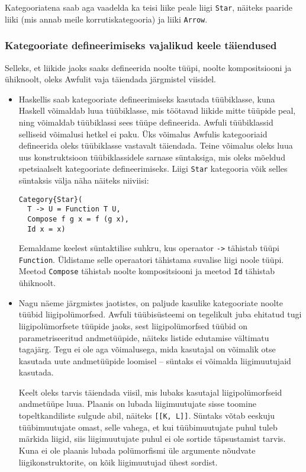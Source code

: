\documentclass[12pt]{article}
\begin{document}
      Kategooriatena saab aga vaadelda ka teisi liike peale liigi \verb!Star!, näiteks paaride liiki (mis annab meile korrutiskategooria) ja liiki \verb!Arrow!.
      \subsubsection{Kategooriate defineerimiseks vajalikud keele täiendused}
        Selleks, et liikide jaoks saaks defineerida noolte tüüpi, noolte kompositsiooni ja ühiknoolt, oleks Awfulit vaja täiendada järgmistel viisidel.

        \begin{itemize}
          \item
            Haskellis saab kategooriate defineerimiseks kasutada tüübiklasse, kuna Haskell võimaldab luua tüübiklasse, mis töötavad liikide mitte tüüpide peal, ning võimaldab tüübiklassi sees tüüpe defineerida. Awfuli tüübiklassid selliseid võimalusi hetkel ei paku. Üks võimalus Awfulis kategooriaid defineerida oleks tüübiklasse vastavalt täiendada. Teine võimalus oleks luua uus konstruktsioon tüübiklassidele sarnase süntaksiga, mis oleks mõeldud spetsiaalselt kategooriate defineerimiseks. Liigi \verb!Star! kategooria võik selles süntaksis välja näha näiteks niiviisi:

            \begin{verbatim}Category{Star}(
  T -> U = Function T U,
  Compose f g x = f (g x),
  Id x = x)\end{verbatim}

            Eemaldame keelest süntaktilise suhkru, kus operaator \verb!->! tähistab tüüpi \verb!Function!. Üldistame selle operaatori tähistama suvalise liigi noole tüüpi. Meetod \verb!Compose! tähistab noolte kompositsiooni ja meetod \verb!Id! tähistab ühiknoolt.
          \item
            Nagu näeme järgmistes jaotistes, on paljude kasulike kategooriate noolte tüübid liigipolümorfsed. Awfuli tüübisüsteemi on tegelikult juba ehitatud tugi liigipolümorfsete tüüpide jaoks, sest liigipolümorfsed tüübid on parametriseeritud andmetüüpide, näiteks listide edutamise vältimatu tagajärg. Tegu ei ole aga võimalusega, mida kasutajal on võimalik otse kasutada uute andmetüüpide loomisel -- süntaks ei võimalda liigimuutujaid kasutada.

            Keelt oleks tarvis täiendada viisil, mis lubaks kasutajal liigipolümorfseid andmetüüpe luua. Plaanis on lubada liigimuutujate sisse toomine topeltkandiliste sulgude abil, näiteks \verb![[K, L]]!. Süntaks võtab eeskuju tüübimuutujate omast, selle vahega, et kui tüübimuutujate puhul tuleb märkida liigid, siis liigimuutujate puhul ei ole sortide täpsustamist tarvis. Kuna ei ole plaanis lubada polümorfismi üle argumente nõudvate liigikonstruktorite, on kõik liigimuutujad ühest sordist.


\end{itemize}
\end{document}
